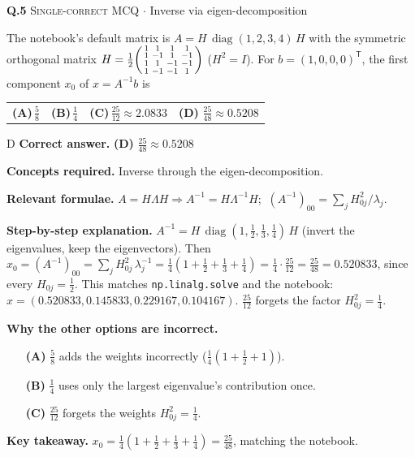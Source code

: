 \documentclass[11pt,a4paper]{article}
\newcommand{\optlabel}[1]{\textbf{(#1)}}
\newcommand{\correctlabel}[1]{\textcolor{okgreen}{\textbf{(#1)}\,\ding{51}}}
\newenvironment{qitem}[1]{\begin{list}{}{\setlength{\leftmargin}{3.3em}\setlength{\labelwidth}{3.1em}%
  \setlength{\labelsep}{0.2em}\setlength{\topsep}{3pt}\setlength{\parsep}{3pt}}\item[\textbf{Q.#1}\hfill]}{\end{list}}
\newcommand{\qsep}{\par\vspace{2pt}{\color{black!15}\hrule}\vspace{4pt}}
\newcommand{\qmeta}[2]{{\footnotesize\color{black!60}\textsc{#1} \;$\cdot$\; #2}\par}
\begin{document}
\begin{qitem}{5}
\qmeta{Single-correct MCQ}{Inverse via eigen-decomposition}
The notebook's default matrix is $A = H\,\operatorname{diag}(1, 2, 3, 4)\,H$ with the symmetric orthogonal matrix
$H = \tfrac12\begin{psmallmatrix}1&1&1&1\\1&-1&1&-1\\1&1&-1&-1\\1&-1&-1&1\end{psmallmatrix}$ ($H^2 = I$). For $b = (1, 0, 0, 0)^{\mathsf T}$, the first component $x_0$ of $x = A^{-1}b$ is
\par\smallskip\noindent\begin{tabularx}{\linewidth}{@{}*{4}{L}@{}}
\optlabel{A}\,$\tfrac{5}{8}$ & \optlabel{B}\,$\tfrac14$ & \optlabel{C}\,$\tfrac{25}{12} \approx 2.0833$ & \correctlabel{D}\,$\tfrac{25}{48} \approx 0.5208$
\end{tabularx}
\end{qitem}
\begin{solbox}{D}
\textbf{\color{brand}Correct answer.} \textcolor{okgreen}{\textbf{(D)}} $\tfrac{25}{48} \approx 0.5208$

\textbf{\color{brand}Concepts required.} Inverse through the eigen-decomposition.

\textbf{\color{brand}Relevant formulae.} $A = H\Lambda H \Rightarrow A^{-1} = H\Lambda^{-1}H$; $\ (A^{-1})_{00} = \sum_jH_{0j}^2/\lambda_j$.

\textbf{\color{brand}Step-by-step explanation.} $A^{-1} = H\,\operatorname{diag}(1, \tfrac12, \tfrac13, \tfrac14)\,H$ (invert the eigenvalues, keep the eigenvectors). Then
$x_0 = (A^{-1})_{00} = \sum_j H_{0j}^2\,\lambda_j^{-1} = \tfrac14\left(1 + \tfrac12 + \tfrac13 + \tfrac14\right) = \tfrac14\cdot\tfrac{25}{12} = \tfrac{25}{48} = 0.520833$,
since every $H_{0j} = \tfrac12$. This matches \texttt{np.linalg.solve} and the notebook: $x = (0.520833, 0.145833, 0.229167, 0.104167)$.
$\tfrac{25}{12}$ forgets the factor $H_{0j}^2 = \tfrac14$.

\textbf{\color{brand}Why the other options are incorrect.}
\begin{itemize}[leftmargin=2.4em, itemsep=1pt, topsep=2pt]
\item[\textbf{(A)}] $\frac58$ adds the weights incorrectly ($\frac14(1 + \frac12 + 1)$).
\item[\textbf{(B)}] $\frac14$ uses only the largest eigenvalue's contribution once.
\item[\textbf{(C)}] $\frac{25}{12}$ forgets the weights $H_{0j}^2 = \frac14$.
\end{itemize}
\textbf{\color{brand}Key takeaway.} $x_0 = \frac14(1 + \frac12 + \frac13 + \frac14) = \frac{25}{48}$, matching the notebook.
\end{solbox}
\qsep
\end{document}
